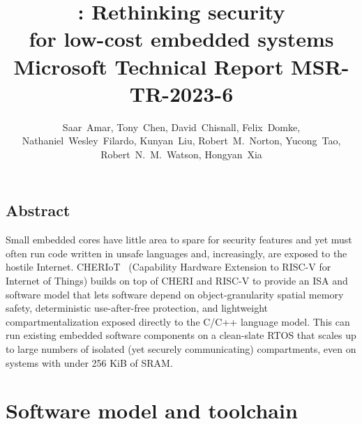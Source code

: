 \documentclass[12pt,letterpaper,twoside,openright,fleqn]{report}
\begin{document}
\title{\cherimcu{}: Rethinking security\\ for low-cost embedded systems \\
  {\large Microsoft Technical Report MSR-TR-2023-6}}
\author{
  \parbox{\linewidth}{\centering%
    Saar~Amar,
    Tony~Chen,
    David~Chisnall,
    Felix~Domke,
    Nathaniel~Wesley~Filardo,
    Kunyan~Liu,
    Robert~M.~Norton,
    Yucong~Tao,
    Robert~N.~M.~Watson,
    Hongyan~Xia
  }%
}

\begin{minipage}[h]{\textwidth}
  \vspace{-.2cm}
  \maketitle
\end{minipage}

\normalsize


\clearpage

\chapter*{Abstract}

Small embedded cores have little area to spare for security features and yet must often run code written in unsafe languages and, increasingly, are exposed to the hostile Internet.
CHERIoT  (Capability Hardware Extension to RISC-V for Internet of Things) builds on top of CHERI and RISC-V to provide an ISA and software model that lets software depend on object-granularity spatial memory safety, deterministic use-after-free protection, and lightweight compartmentalization exposed directly to the C/C++ language model.
This can run existing embedded software components on a clean-slate RTOS that scales up to large numbers of isolated (yet securely communicating) compartments, even on systems with under 256 KiB of SRAM.

\clearpage



\clearpage



\clearpage



\clearpage

\tableofcontents

\part{Software model and toolchain}
\label{part:sw}
\end{document}
